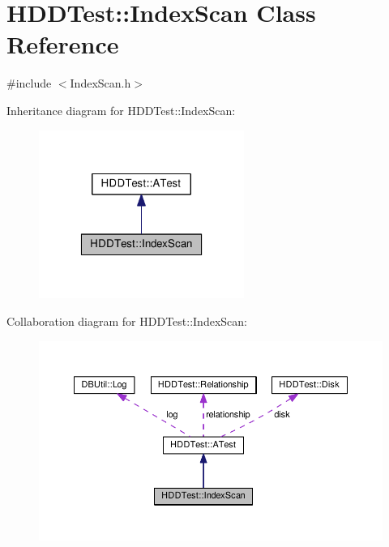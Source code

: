 \hypertarget{class_h_d_d_test_1_1_index_scan}{\section{H\-D\-D\-Test\-:\-:Index\-Scan Class Reference}
\label{class_h_d_d_test_1_1_index_scan}
}


{\ttfamily \#include $<$Index\-Scan.\-h$>$}



Inheritance diagram for H\-D\-D\-Test\-:\-:Index\-Scan\-:
\nopagebreak
\begin{figure}[H]
\begin{center}
\leavevmode
\includegraphics[width=190pt]{class_h_d_d_test_1_1_index_scan__inherit__graph}
\end{center}
\end{figure}


Collaboration diagram for H\-D\-D\-Test\-:\-:Index\-Scan\-:
\nopagebreak
\begin{figure}[H]
\begin{center}
\leavevmode
\includegraphics[width=350pt]{class_h_d_d_test_1_1_index_scan__coll__graph}
\end{center}
\end{figure}
